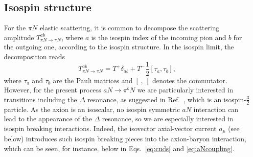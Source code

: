 \documentclass[reprint,amssymb,amsmath,floatfix,aps,prd,groupedaddress,nofootinbib]{revtex4-2}
\newcommand{\com}[2]{\left[ #1,#2 \right]}
\begin{document}
\subsection{Isospin structure}\label{ssec:isospin}

For the $\pi N$ elastic scattering, it is common to decompose the scattering amplitude $T^{ab}_{\pi N\to\pi N}$, where $a$ is
the isospin index of the incoming pion and $b$ for the outgoing one, according to the isospin structure.
In the isospin limit, the decomposition reads
\begin{equation}\label{eq:piNiso}
T^{ab}_{\pi N\to\pi N} = T^+ \delta_{ab} + T^- \frac{1}{2}\com{\tau_a}{\tau_b},
\end{equation}
where $\tau_a$ and $\tau_b$ are the Pauli matrices and $\com{\ }{\ }$ denotes the commutator. However, for the
present process $aN\to \pi^b N$ we are particularly interested in transitions including the $\Delta$ resonance, as suggested in Ref.~\cite{Carenza:2020cis},
which is an isospin-$\tfrac{3}{2}$ particle. As the axion is an isoscalar, no isospin symmetric $aN$
interaction can lead to the appearance of the $\Delta$ resonance, so we are especially interested in isospin
breaking interactions. Indeed, the isovector axial-vector current $a_\mu$ (see below) introduces such
isospin breaking pieces into the axion-baryon interaction, which can be seen, for instance, below in
Eqs.~\eqref{eq:cuds} and \eqref{eq:aNcoupling}.
\end{document}
